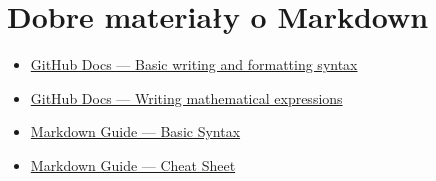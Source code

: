 \documentclass[12pt, a4paper]{article}
\begin{document}
\section{Dobre materiały o Markdown}
\begin{itemize}
\item \href{https://docs.github.com/en/get-started/writing-on-github/getting-started-with-writing-and-formatting-on-github/basic-writing-and-formatting-syntax}{GitHub Docs --- Basic writing and formatting syntax}
\item \href{https://docs.github.com/en/get-started/writing-on-github/working-with-advanced-formatting/writing-mathematical-expressions}{GitHub Docs --- Writing mathematical expressions}
\item \href{https://www.markdownguide.org/basic-syntax/}{Markdown Guide --- Basic Syntax}
\item \href{https://www.markdownguide.org/cheat-sheet/}{Markdown Guide --- Cheat Sheet}
\end{itemize}
\end{document}
